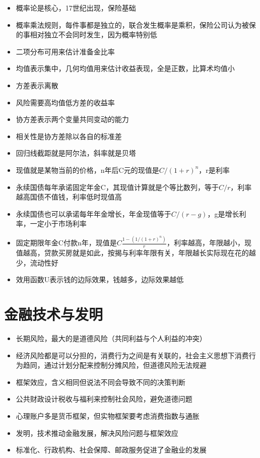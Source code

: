 \documentclass[]{book}
\providecommand{\tightlist}{%
  \setlength{\itemsep}{0pt}\setlength{\parskip}{0pt}}
\begin{document}
\begin{itemize}
\tightlist
\item
  概率论是核心，17世纪出现，保险基础
\item
  概率乘法规则，每件事都是独立的，联合发生概率是乘积，保险公司认为被保的事相对独立不会同时发生，因为概率特别低
\item
  二项分布可用来估计准备金比率
\item
  均值表示集中，几何均值用来估计收益表现，全是正数，比算术均值小
\item
  方差表示离散
\item
  风险需要高均值低方差的收益率
\item
  协方差表示两个变量共同变动的能力
\item
  相关性是协方差除以各自的标准差
\item
  回归线截距就是阿尔法，斜率就是贝塔
\item
  现值就是某物当前的价格，n年后C元的现值是\(C/(1+r)^n\)，r是利率
\item
  永续国债每年承诺固定年金C，其现值计算就是个等比数列，等于\(C/r\)，利率越高国债不值钱，利率低时现值高
\item
  永续国债也可以承诺每年年金增长，年金现值等于\(C/(r-g)\)，g是增长利率，一定小于市场利率
\item
  固定期限年金C付款n年，现值是\(C\frac{1-(1/(1+r)^n)}{r}\)，利率越高，年限越小，现值越高，贷款买房就是如此，按揭与利率年限有关，年限越长实际现在花的越少，流动性好
\item
  效用函数U表示钱的边际效果，钱越多，边际效果越低
\end{itemize}

\section{金融技术与发明}

\begin{itemize}
\tightlist
\item
  长期风险，最大的是道德风险（共同利益与个人利益的冲突）
\item
  经济风险都是可以分担的，消费行为之间是有关联的，社会主义思想下消费行为趋同，通过计划分配来控制分摊风险，但道德风险无法规避
\item
  框架效应，含义相同但说法不同会导致不同的决策判断
\item
  公共财政设计税收与福利来控制社会风险，避免道德问题
\item
  心理账户多是货币框架，但实物框架要考虑消费指数与通胀
\item
  发明，技术推动金融发展，解决风险问题与框架效应
\item
  标准化、行政机构、社会保障、邮政服务促进了金融业的发展
\end{itemize}
\end{document}
